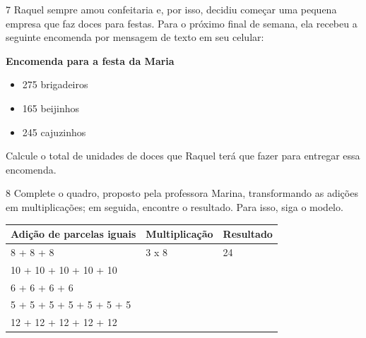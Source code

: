 

\num{7} Raquel sempre amou confeitaria e, por isso, decidiu começar uma pequena empresa que faz doces para festas. Para o próximo final de semana, ela
recebeu a seguinte encomenda por mensagem de texto em seu celular:

\textbf{Encomenda para a festa da Maria}

\begin{itemize}
\item 275 brigadeiros

\item 165 beijinhos

\item 245 cajuzinhos
\end{itemize}

Calcule o total de unidades de doces que Raquel terá que fazer para entregar essa encomenda.


\num{8} Complete o quadro, proposto pela professora Marina, transformando
as adições em multiplicações; em seguida, encontre o resultado. Para isso, siga o modelo.

\begin{longtable}[]{@{}lll@{}}
\toprule
Adição de parcelas iguais & Multiplicação & Resultado\tabularnewline
\midrule
\endhead
8 + 8 + 8 & 3 x 8 & 24\tabularnewline
10 + 10 + 10 + 10 + 10 & &\tabularnewline
6 + 6 + 6 + 6 & &\tabularnewline
5 + 5 + 5 + 5 + 5 + 5 + 5 & &\tabularnewline
12 + 12 + 12 + 12 + 12 & &\tabularnewline
\bottomrule
\end{longtable}


